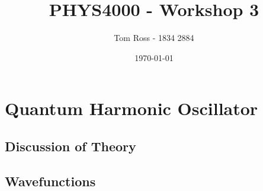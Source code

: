 \documentclass{article}
\title{PHYS4000 - Workshop 3}
\author{Tom Ross - 1834 2884}
\date{\today}
\begin{document}
\tableofcontents

\listoffigures

\listoftables

\clearpage

\section{Quantum Harmonic Oscillator}
\label{sec:qho}

\subsection*{Discussion of Theory}
\label{sec:qho-theory}

\subsection*{Wavefunctions}
\label{sec:qho-wavefunctions}
\end{document}
